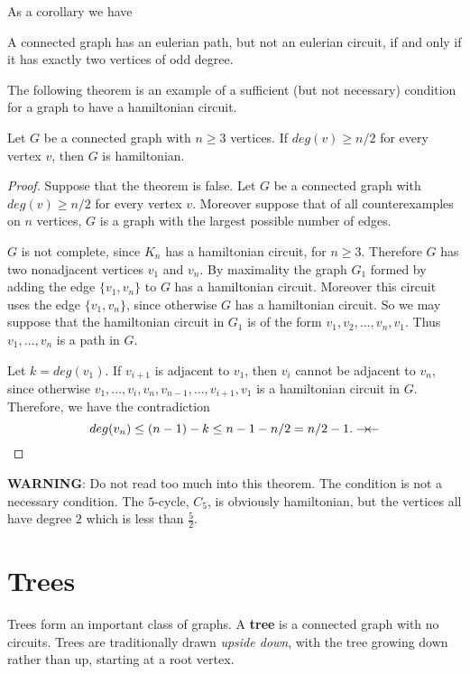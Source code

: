 As a corollary we have
\begin{thm}
 A connected graph has an eulerian path, but not an eulerian circuit,   if
 and only if
 it has exactly two vertices of odd degree.
\end{thm}

The following theorem is an example of a sufficient (but not necessary) condition for a graph to have a hamiltonian
circuit. 
\begin{thm}
 Let $G$ be a connected graph with $n\geq 3$ vertices. If $deg(v)\geq n/2$
 for every vertex $v$, then $G$ is hamiltonian.
\end{thm}
\begin{proof}
 Suppose that the theorem is false.
 Let $G$ be a connected graph with $deg(v)\geq n/2$
 for every vertex $v$.
 Moreover suppose that of all counterexamples on $n$ vertices, $G$ is a graph with the largest possible number of edges. 
 
 $G$ is not complete, since $K_n$ has a hamiltonian circuit, for $n\geq 3$. Therefore
 $G$ has two nonadjacent vertices $v_1$ and $v_n$. By maximality
 the graph $G_1$ formed by adding the edge $\{v_1,v_n\}$ to $G$ has a hamiltonian circuit. Moreover this circuit uses the
 edge $\{v_1,v_n\}$, since otherwise $G$ has a hamiltonian circuit. So we may suppose that the hamiltonian
 circuit in $G_1$ is of the form $v_1,v_2,...,v_n,v_1$. Thus $v_1,...,v_n$ is a  path
 in $G$.
 
 Let $k=deg(v_1)$. 
 If $v_{i+1}$ is adjacent to $v_1$, then $v_i$ cannot be adjacent to $v_n$, since otherwise $v_1,...,v_i,v_n,v_{n-1},...,v_{i+1},v_1$ is a
 hamiltonian circuit in $G$. Therefore, we have the contradiction
 \[
  deg(v_n)\leq (n-1)-k\leq n-1-n/2=n/2-1.\rightarrow \!\leftarrow
 \]
\end{proof} 

{\bfseries WARNING}:  Do not read too much into this theorem. The condition is  not a necessary condition. The $5${-}cycle, $C_5$, is obviously hamiltonian, but the vertices all have degree $2$ which is less than $\frac{5}{2}$.

\bigskip

\section{Trees}
Trees form an important class of graphs. A {\bfseries {tree}} is a connected graph with
no circuits.  Trees are traditionally drawn {\it upside down}, with the tree growing down rather than up,  starting at a root vertex.
 
